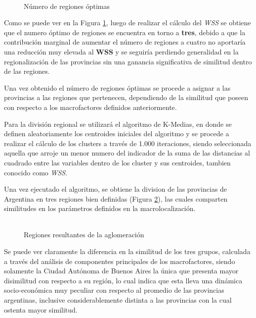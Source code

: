 \documentclass[12pt,a4paper]{article}
\begin{document}
\begin{figure}[h!]
\begin{center}
	\caption{\\Número de regiones óptimas}
 	
	\label{figure:optimas}
\end{center}
\end{figure}
\newpage

Como se puede ver en la Figura \ref{figure:optimas}, luego de realizar el cálculo del \textit{WSS} se obtiene que el numero óptimo de regiones se encuentra en torno a \textbf{tres}, debido a que la contribución marginal de aumentar el número de  regiones a cuatro no aportaría una reducción muy elevada al \textbf{WSS} y se seguiría perdiendo generalidad en la regionalización de las provincias sin una ganancia significativa de similitud dentro de las regiones.

Una vez obtenido el número de regiones óptimas se procede a asignar a las provincias a las regiones que pertenecen, dependiendo de la similitud que poseen con respecto a los macrofactores definidos anteriormente.

Para la división regional se utilizará el algoritmo de K-Medias, en donde se definen aleatoriamente los centroides iniciales del algoritmo y se procede a realizar el cálculo de los clusters a través de 1.000 iteraciones, siendo seleccionada aquella  que arroje un menor numero del indicador de la suma de las distancias al cuadrado entre las variables dentro de  los cluster y sus centroides, tambien conocido como \textit{WSS}.

Una vez ejecutado el algoritmo, se obtiene la division de las provincias de Argentina en tres regiones bien definidas (Figura \ref{figure:reg_resultantes}), las cuales comparten similitudes en los parámetros definidos en la macrolocalización.


\begin{figure}[ht!]
\begin{center}
\caption{\\Regiones resultantes de la aglomeración}

\label{figure:reg_resultantes}
\end{center}
\end{figure}
\newpage
Se puede ver claramente la diferencia en la similitud de los tres grupos, calculada a través del análisis de componentes principales de los macrofactores, siendo solamente la Ciudad Autónoma de Buenos Aires la única que presenta mayor disimilitud con respecto a su región, lo cual indica que esta  lleva una dinámica socio-económica muy peculiar con respecto al promedio de las provincias argentinas, inclusive considerablemente distinta a las provincias con la cual ostenta mayor similitud.
\end{document}
